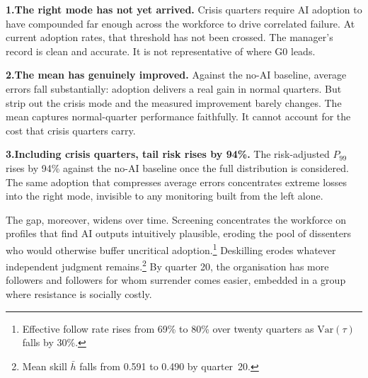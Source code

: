 \documentclass[11pt,a4paper]{article}
\begin{document}
\begin{mdframed}[
  backgroundcolor=gray!5,
  linewidth=0.8pt,
  linecolor=black!25,
  frametitle={\small\bfseries Key insights},
  frametitlebackgroundcolor=gray!15,
  frametitleaboveskip=3pt,
  frametitlebelowskip=6pt,
  frametitlerule=true,
  frametitlerulecolor=black!15,
  frametitlerulewidth=0.5pt,
  innertopmargin=8pt,
  innerbottommargin=10pt,
  innerleftmargin=14pt,
  innerrightmargin=14pt
]
\small

\noindent\textbf{1.\enspace The right mode has not yet arrived.}\enspace
Crisis quarters require AI adoption to have compounded far enough across
the workforce to drive correlated failure. At current adoption rates,
that threshold has not been crossed. The manager's record is clean and
accurate. It is not representative of where G0 leads.

\medskip
\noindent\textbf{2.\enspace The mean has genuinely improved.}\enspace
Against the no-AI baseline, average errors fall substantially: adoption
delivers a real gain in normal quarters. But strip out the crisis mode
and the measured improvement barely changes. The mean captures
normal-quarter performance faithfully. It cannot account for the cost
that crisis quarters carry.

\medskip
\noindent\textbf{3.\enspace Including crisis quarters, tail risk rises
by 94\%.}\enspace
The risk-adjusted $P_{99}$ rises by 94\% against the no-AI baseline once
the full distribution is considered. The same adoption that compresses
average errors concentrates extreme losses into the right mode, invisible
to any monitoring built from the left alone.
\end{mdframed}

The gap, moreover, widens over time. Screening concentrates the workforce on profiles
that find AI outputs intuitively plausible, eroding the pool of dissenters
who would otherwise buffer uncritical adoption.\footnote{Effective follow
rate rises from 69\% to 80\% over twenty quarters as $\text{Var}(\tau)$
falls by 30\%.} Deskilling erodes whatever independent judgment
remains.\footnote{Mean skill $\bar{h}$ falls from 0.591 to 0.490 by
quarter~20.} By quarter 20, the organisation has more followers and
followers for whom surrender comes easier, embedded in a group where
resistance is socially costly.
\end{document}

